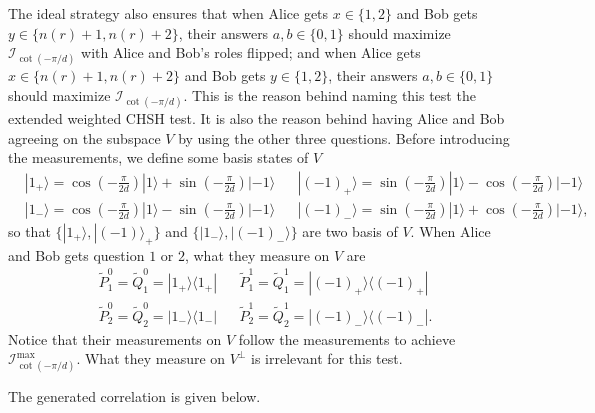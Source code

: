 \documentclass[11pt,letterpaper]{article}
\newcommand{\ket}[1]{|#1\rangle}
\newcommand{\ketbra}[2]{|#1\rangle\langle#2|}
\newcommand{\1}{\mathbb{1}}
\newcommand{\tP}{\tilde{P}}
\newcommand{\tQ}{\tilde{Q}}
\newcommand{\nr}{n(r)}
\newcommand{\I}{\mathcal{I}}
\theoremstyle{definition}
\begin{document}
The ideal strategy also ensures that 
when Alice gets $x \in \{1,2\}$ and Bob gets $y \in \{\nr+1, \nr+2\}$, 
their answers $a,b \in \{0,1\}$ should maximize $\I_{\cot(-\pi/d)}$ with Alice and Bob's roles flipped;
and when Alice gets $x \in \{\nr+1,\nr+2\}$ and Bob gets $y \in \{1, 2\}$,
their answers $a,b \in \{0,1\}$ should maximize $\I_{\cot(-\pi/d)}$.
This is the reason behind naming this test the extended weighted CHSH test.
It is also the reason behind having Alice and Bob agreeing on the subspace $V$ 
by using the other three questions.
Before introducing the measurements, 
we define some basis states of $V$
\begin{align*}
	&\ket{1_+} = \cos(-\frac{\pi}{2d})\ket{1} + \sin(-\frac{\pi}{2d})\ket{-1}
	&&\ket{(-1)_+} = \sin(-\frac{\pi}{2d})\ket{1} - \cos(-\frac{\pi}{2d})\ket{-1}\\
	&\ket{1_-} = \cos(-\frac{\pi}{2d})\ket{1} - \sin(-\frac{\pi}{2d})\ket{-1}
	&&\ket{(-1)_-} = \sin(-\frac{\pi}{2d})\ket{1} + \cos(-\frac{\pi}{2d})\ket{-1},
\end{align*}
so that $\{\ket{1_+}, \ket{(-1)}_+\}$ and $\{\ket{1_-}, \ket{(-1)_-}\}$ are two basis
of $V$.
When Alice and Bob gets question $1$ or $2$, what they measure on $V$ are
\begin{align*}
	&\tP_1^0 = \tQ_1^0 =  \ketbra{1_+}{1_+} && \tP_1^1 = \tQ_1^1 =  \ketbra{(-1)_+}{(-1)_+}\\
	&\tP_2^0 = \tQ_2^0 =  \ketbra{1_-}{1_-} && \tP_2^1 = \tQ_2^1 =  \ketbra{(-1)_-}{(-1)_-}.
\end{align*}
Notice that their measurements on $V$ follow the measurements to achieve $\I_{\cot(-\pi/d)}^{\max}$.
What they measure on $V^\perp$ is irrelevant for this test.

The generated correlation is given below.
\end{document}
